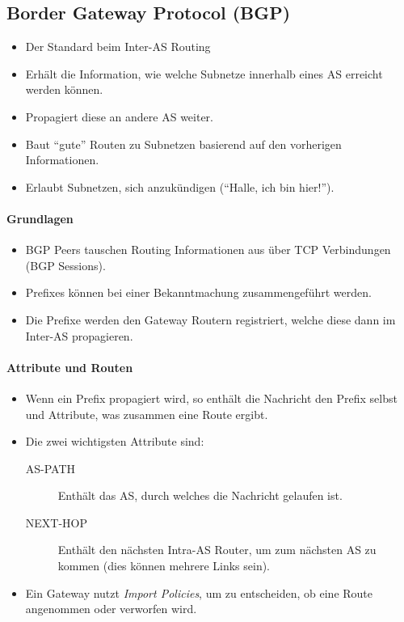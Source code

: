 		\subsection{Border Gateway Protocol (BGP)}
			\begin{itemize}
				\item Der Standard beim Inter-AS Routing
				\item Erhält die Information, wie welche Subnetze innerhalb eines AS erreicht werden können.
				\item Propagiert diese an andere AS weiter.
				\item Baut \enquote{gute} Routen zu Subnetzen basierend auf den vorherigen Informationen.
				\item Erlaubt Subnetzen, sich anzukündigen (\enquote{Halle, ich bin hier!}).
			\end{itemize}

			\paragraph{Grundlagen}
				\begin{itemize}
					\item BGP Peers tauschen Routing Informationen aus über TCP Verbindungen (BGP Sessions).
					\item Prefixes können bei einer Bekanntmachung zusammengeführt werden.
					\item Die Prefixe werden den Gateway Routern registriert, welche diese dann im Inter-AS propagieren.
				\end{itemize}

			\paragraph{Attribute und Routen}
				\begin{itemize}
					\item Wenn ein Prefix propagiert wird, so enthält die Nachricht den Prefix selbst und Attribute, was zusammen eine Route ergibt.
					\item Die zwei wichtigsten Attribute sind:
						\begin{description}
							\item[AS-PATH] Enthält das AS, durch welches die Nachricht gelaufen ist.
							\item[NEXT-HOP] Enthält den nächsten Intra-AS Router, um zum nächsten AS zu kommen (dies können mehrere Links sein).
						\end{description}
					\item Ein Gateway nutzt \textit{Import Policies}, um zu entscheiden, ob eine Route angenommen oder verworfen wird.
				\end{itemize}

